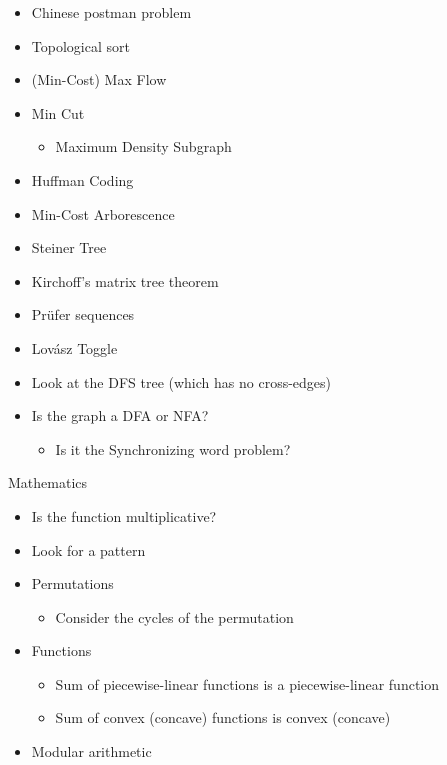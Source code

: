 \begin{myitemize}
\begin{itemize}
          \item Chinese postman problem
          \item Topological sort
          \item (Min-Cost) Max Flow
          \item Min Cut
            \begin{itemize}
              \item Maximum Density Subgraph
            \end{itemize}
          \item Huffman Coding
          \item Min-Cost Arborescence
          \item Steiner Tree
          \item Kirchoff's matrix tree theorem
          \item Pr\"ufer sequences
          \item Lov\'asz Toggle
          \item Look at the DFS tree (which has no cross-edges)
          \item Is the graph a DFA or NFA?
              \begin{itemize}
                \item Is it the Synchronizing word problem?
              \end{itemize}
        \end{itemize}
      \item Mathematics
        \begin{itemize}
          \item Is the function multiplicative?
          \item Look for a pattern
          \item Permutations
            \begin{itemize}
              \item Consider the cycles of the permutation
            \end{itemize}
          \item Functions
            \begin{itemize}
              \item Sum of piecewise-linear functions is a piecewise-linear function
              \item Sum of convex (concave) functions is convex (concave)
            \end{itemize}
          \item Modular arithmetic
            \begin{itemize}

\end{itemize}
\end{itemize}
\end{myitemize}

